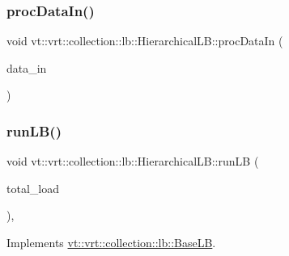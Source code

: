 \subsubsection{\texorpdfstring{proc\+Data\+In()}{procDataIn()}}
{\footnotesize\ttfamily void vt\+::vrt\+::collection\+::lb\+::\+Hierarchical\+L\+B\+::proc\+Data\+In (\begin{DoxyParamCaption}\item[{\hyperlink{structvt_1_1vrt_1_1collection_1_1lb_1_1_base_l_b_aa286d31a0820a8fc9218ccb858368fca}{Element\+Load\+Type} const \&}]{data\+\_\+in }\end{DoxyParamCaption})}

\mbox{\label{structvt_1_1vrt_1_1collection_1_1lb_1_1_hierarchical_l_b_a8678acfa7b587e6003a4701def240595}} 
\subsubsection{\texorpdfstring{run\+L\+B()}{runLB()}}
{\footnotesize\ttfamily void vt\+::vrt\+::collection\+::lb\+::\+Hierarchical\+L\+B\+::run\+LB (\begin{DoxyParamCaption}\item[{\hyperlink{namespacevt_a876a9d0cd5a952859c72de8a46881442}{Time\+Type}}]{total\+\_\+load }\end{DoxyParamCaption})\hspace{0.3cm}{\ttfamily [override]}, {\ttfamily [virtual]}}



Implements \hyperlink{structvt_1_1vrt_1_1collection_1_1lb_1_1_base_l_b_a7caaf2483f046927fd7534a084a8c1b2}{vt\+::vrt\+::collection\+::lb\+::\+Base\+LB}.

\mbox{\label{structvt_1_1vrt_1_1collection_1_1lb_1_1_hierarchical_l_b_a1b7abcf40a8dfb63e9a2ee0842af413b}} 
